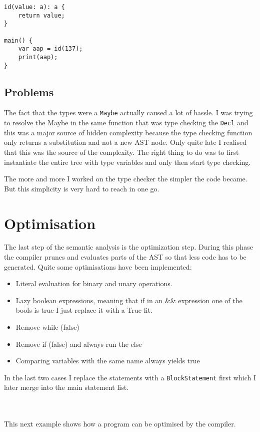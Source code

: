 \documentclass{report}
\begin{document}
\begin{lstlisting}[style=SPL]
id(value: a): a {
    return value;
}

main() { 
    var aap = id(137);
    print(aap);
}
\end{lstlisting}

\subsection{Problems}

\noindent The fact that the types were a \texttt{Maybe} actually caused a lot of hassle. I was trying to resolve the Maybe in the same function that was type checking the \texttt{Decl} and this was a major source of hidden complexity because the type checking function only returns a substitution and not a new AST node. Only quite late I realised that this was the source of the complexity. The right thing to do was to first instantiate the entire tree with type variables and only then start type checking. 

The more and more I worked on the type checker the simpler the code became. But this simplicity is
very hard to reach in one go.

\section{Optimisation} \label{sec:Optimisation}

The last step of the semantic analysis is the optimization step. During this phase the compiler prunes and evaluates parts of the AST so that less code has to be generated. Quite some optimisations have been implemented:
\begin{itemize}
    \item Literal evaluation for binary and unary operations.
    \item Lazy boolean expressions, meaning that if in an && expression one of the bools is true I just replace it with a True lit.
    \item Remove while (false)
    \item Remove if (false) and always run the else
    \item Comparing variables with the same name always yields true
\end{itemize}

\noindent In the last two cases I replace the statements with a \texttt{BlockStatement} first which I later merge into the main statement list.

\\\\
\noindent This next example shows how a program can be optimised by the compiler.
\end{document}
